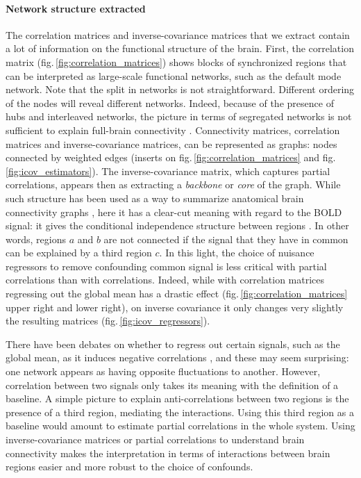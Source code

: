 \documentclass[5p]{elsarticle}
\begin{document}
\paragraph{Network structure extracted}
%
The correlation matrices and inverse-covariance matrices that we extract
contain a lot of information on the functional structure of the brain.
First, the correlation matrix (fig.\,\ref{fig:correlation_matrices})
shows blocks of synchronized regions that can be interpreted as
large-scale functional networks, such as the default mode network. Note
that the split in networks is not straightforward. Different ordering of the
nodes will reveal different networks. 
Indeed, because of the presence of
hubs and interleaved networks, the picture in terms of segregated networks
is not sufficient to explain full-brain connectivity
\cite{varoquaux2012}. Connectivity matrices, correlation matrices and
inverse-covariance matrices, can be represented as graphs: nodes connected
by weighted edges (inserts on fig.\,\ref{fig:correlation_matrices} and
fig.\,\ref{fig:icov_estimators}). The inverse-covariance matrix, which
captures partial correlations, appears then as extracting a
\emph{backbone} or \emph{core} of the graph.
While such structure has
been used as a way to summarize anatomical brain connectivity graphs
\cite{hagmann2008}, here it has a clear-cut meaning with regard to
the BOLD signal: it gives the conditional independence structure between
regions \cite{varoquaux2012}. In other words, regions $a$ and $b$ are
not connected if the signal that they have in common can be explained by
a third region $c$. In this light, the choice of nuisance regressors to
remove confounding common signal is less critical with partial
correlations than with correlations. Indeed, while with
correlation matrices regressing out the global mean has a drastic effect
(fig.\,\ref{fig:correlation_matrices} upper right and lower right), on
inverse covariance it only changes very slightly the resulting matrices
(fig.\,\ref{fig:icov_regressors}).

There have been debates on whether to
regress out certain signals, such as the global mean,  as it induces
negative correlations \cite{murphy2009,chang2009,fox2009}, and these may seem
surprising: one network appears as having opposite fluctuations to
another. However,
correlation between two signals only takes its meaning with the
definition of a baseline. A simple picture to explain anti-correlations
between two regions is the presence of a third region, mediating the
interactions. Using this third region as a baseline would amount to
estimate partial correlations in the whole system. Using 
inverse-covariance matrices or partial correlations to understand brain
connectivity makes the interpretation in terms of interactions between
brain regions easier and more robust to the choice of confounds.
\end{document}
